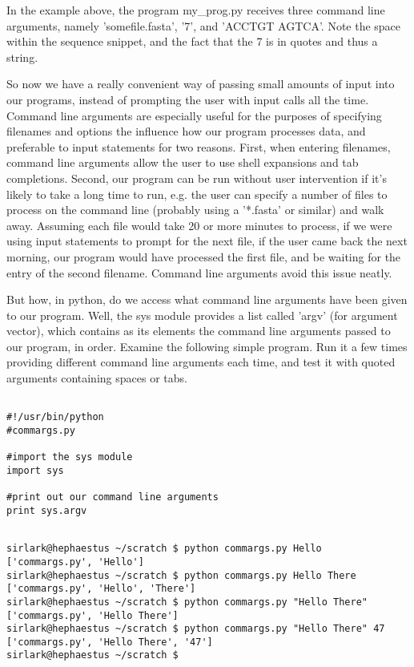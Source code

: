 In the example above, the program my\_prog.py receives three command   line arguments, namely 'somefile.fasta', '7', and 'ACCTGT AGTCA'. Note   the space within the sequence snippet, and the fact that the 7 is in   quotes and thus a string.

So now we have a really convenient way of passing small amounts of   input into our programs, instead of prompting the user with input   calls all the time. Command line arguments are especially useful for   the purposes of specifying filenames and options the influence how our   program processes data, and preferable to input statements for two   reasons. First, when entering filenames, command line arguments allow   the user to use shell expansions and tab completions. Second, our   program can be run without user intervention if it's likely to take a   long time to run, e.g. the user can specify a number of files to   process on the command line (probably using a '*.fasta' or similar) and   walk away. Assuming each file would take 20 or more minutes to process,   if we were using input statements to prompt for the next file, if   the user came back the next morning, our program would have processed   the first file, and be waiting for the entry of the second filename.   Command line arguments avoid this issue neatly.

But how, in python, do we access what command line arguments have   been given to our program. Well, the sys module provides a list called   'argv' (for argument vector), which contains as its elements the   command line arguments passed to our program, in order. Examine the   following simple program. Run it a few times providing different   command line arguments each time, and test it with quoted arguments   containing spaces or tabs.
\begin{lstlisting}

#!/usr/bin/python
#commargs.py

#import the sys module
import sys

#print out our command line arguments
print sys.argv
\end{lstlisting}
\begin{lstlisting}

sirlark@hephaestus ~/scratch $ python commargs.py Hello
['commargs.py', 'Hello']
sirlark@hephaestus ~/scratch $ python commargs.py Hello There
['commargs.py', 'Hello', 'There']
sirlark@hephaestus ~/scratch $ python commargs.py "Hello There"
['commargs.py', 'Hello There']
sirlark@hephaestus ~/scratch $ python commargs.py "Hello There" 47
['commargs.py', 'Hello There', '47']
sirlark@hephaestus ~/scratch $
\end{lstlisting}

